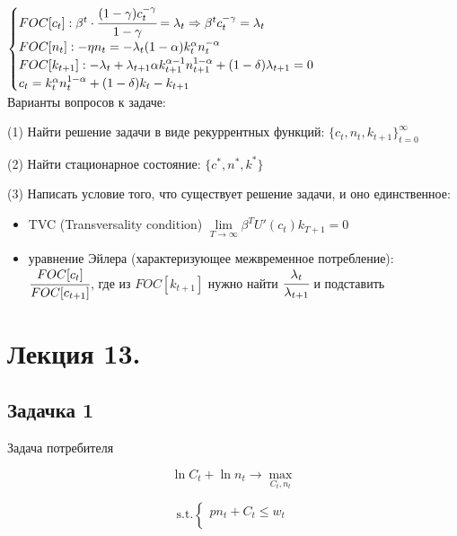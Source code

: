 \documentclass[reqno]{article}
\theoremstyle{definition}
\theoremstyle{definition}
\theoremstyle{definition}
\theoremstyle{definition}
\theoremstyle{definition}
\theoremstyle{definition}
\theoremstyle{definition}
\theoremstyle{definition}
\theoremstyle{definition}
\begin{document}
	$
	\begin{cases}
		FOC[c_t]: \beta^t \cdot \cfrac{(1-\gamma) c_t ^{-\gamma}}{1-\gamma}=\lambda_t \Rightarrow \beta^t c_t^{-\gamma}=\lambda_t\\
		
		FOC[n_t]: -\eta n_t = -\lambda_t (1-\alpha)k_t^\alpha n_t^{-\alpha} \\
		
		FOC[k_{t+1}]: -\lambda_t+\lambda_{t+1} \alpha k_{t+1}^{\alpha-1} n_{t+1}^{1-\alpha} + (1-\delta)\lambda_{t+1} = 0\\
		
		c_t = k_t^\alpha n_t^{1-\alpha} + (1-\delta)k_t - k_{t+1} \\
	\end{cases}
	$ \\ 
	
	Варианты вопросов к задаче:
	
	(1) Найти решение задачи в виде рекуррентных функций: $\{c_t,n_t,k_{t+1}\}^\infty_{t=0}$ 
	
	(2) Найти стационарное состояние: $\{c^*,n^*,k^*\}$
	
	(3) Написать условие того, что существует решение задачи, и оно единственное:
	
	\begin{itemize}
		\item TVC (Transversality condition) $\lim\limits_{T \rightarrow \infty} \beta^T U'(c_t) k_{T+1}=0$
		
		\item уравнение Эйлера (характеризующее межвременное потребление): $\cfrac{FOC[c_t]}{FOC[c_{t+1}]}$, где из $FOC[k_{t+1}]$ нужно найти $\cfrac{\lambda_t}{\lambda_{t+1}}$ и подставить
	\end{itemize}
	
		\newpage
	
	\section{Лекция 13.}
	
	\subsection{Задачка 1}
	
	Задача потребителя
	
	$$\ln C_t + \ln n_t \rightarrow \max\limits_{C_t,n_t}$$
	
	$$
	\text{s.t.}
	\begin{cases}
		p n_t + C_t \leq w_t \\
	\end{cases}
	$$
	
\end{document}
